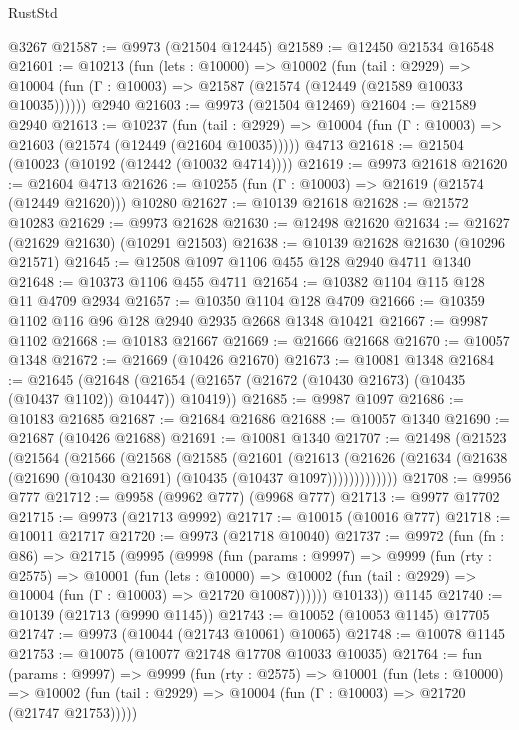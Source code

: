 \begin{lexlean}{RustStd}
\begin{coremodule}
    @3267
@21587 := @9973 (@21504 @12445)
@21589 := @12450 @21534 @16548
@21601 := @10213
    (fun (lets : @10000) =>
    @10002
      (fun (tail : @2929) =>
      @10004 (fun (Γ : @10003) => @21587 (@21574 (@12449 (@21589 @10033 @10035))))))
    @2940
@21603 := @9973 (@21504 @12469)
@21604 := @21589 @2940
@21613 := @10237
    (fun (tail : @2929) => @10004 (fun (Γ : @10003) => @21603 (@21574 (@12449 (@21604 @10035)))))
    @4713
@21618 := @21504 (@10023 (@10192 (@12442 (@10032 @4714))))
@21619 := @9973 @21618
@21620 := @21604 @4713
@21626 := @10255 (fun (Γ : @10003) => @21619 (@21574 (@12449 @21620))) @10280
@21627 := @10139 @21618
@21628 := @21572 @10283
@21629 := @9973 @21628
@21630 := @12498 @21620
@21634 := @21627 (@21629 @21630) (@10291 @21503)
@21638 := @10139 @21628 @21630 (@10296 @21571)
@21645 := @12508 @1097 @1106 @455 @128 @2940 @4711 @1340
@21648 := @10373 @1106 @455 @4711
@21654 := @10382 @1104 @115 @128 @11 @4709 @2934
@21657 := @10350 @1104 @128 @4709
@21666 := @10359 @1102 @116 @96 @128 @2940 @2935 @2668 @1348 @10421
@21667 := @9987 @1102
@21668 := @10183 @21667
@21669 := @21666 @21668
@21670 := @10057 @1348
@21672 := @21669 (@10426 @21670)
@21673 := @10081 @1348
@21684 := @21645
    (@21648 (@21654 (@21657 (@21672 (@10430 @21673) (@10435 (@10437 @1102)) @10447)) @10419))
@21685 := @9987 @1097
@21686 := @10183 @21685
@21687 := @21684 @21686
@21688 := @10057 @1340
@21690 := @21687 (@10426 @21688)
@21691 := @10081 @1340
@21707 := @21498
    (@21523
      (@21564
        (@21566
          (@21568
            (@21585
              (@21601
                (@21613
                  (@21626 (@21634 (@21638 (@21690 (@10430 @21691) (@10435 (@10437 @1097)))))))))))))
@21708 := @9956 @777
@21712 := @9958 (@9962 @777) (@9968 @777)
@21713 := @9977 @17702
@21715 := @9973 (@21713 @9992)
@21717 := @10015 (@10016 @777)
@21718 := @10011 @21717
@21720 := @9973 (@21718 @10040)
@21737 := @9972
    (fun (fn : @86) =>
    @21715
      (@9995
        (@9998
          (fun (params : @9997) =>
          @9999
            (fun (rty : @2575) =>
            @10001
              (fun (lets : @10000) =>
              @10002 (fun (tail : @2929) => @10004 (fun (Γ : @10003) => @21720 @10087))))))
        @10133))
    @1145
@21740 := @10139 (@21713 (@9990 @1145))
@21743 := @10052 (@10053 @1145) @17705
@21747 := @9973 (@10044 (@21743 @10061) @10065)
@21748 := @10078 @1145
@21753 := @10075 (@10077 @21748 @17708 @10033 @10035)
@21764 := fun (params : @9997) =>
  @9999
    (fun (rty : @2575) =>
    @10001
      (fun (lets : @10000) =>
      @10002 (fun (tail : @2929) => @10004 (fun (Γ : @10003) => @21720 (@21747 @21753)))))

\end{coremodule}
\end{lexlean}
